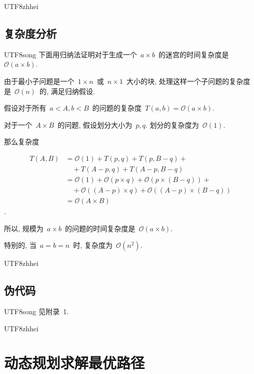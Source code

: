 \documentclass[10.5pt,compsoc]{CjC}
\theoremstyle{mystyle}
\begin{document}
\begin{CJK*}{UTF8}{zhhei}\subsection{复杂度分析}\end{CJK*}

\begin{CJK*}{UTF8}{song}
下面用归纳法证明对于生成一个~$a \times b$~的迷宫的时间复杂度是~$\mathcal{O}(a \times b)$.

由于最小子问题是一个~$1 \times n$~或~$n \times 1$~大小的块, 
处理这样一个子问题的复杂度是~$\mathcal{O}(n)$~的, 满足归纳假设.

假设对于所有~$a < A, b < B$~的问题的复杂度~$T(a,b) = \mathcal{O}(a \times b)$.

对于一个~$A \times B$~的问题, 假设划分大小为~$p, q$. 划分的复杂度为~$\mathcal{O}(1)$.

那么复杂度

\vskip -4mm

\begin{align*}
T(A,B) &= \mathcal{O}(1) + T(p,q) + T(p,B-q) + {} \\
       &\quad + T(A-p,q) + T(A-p,B-q) \\
       &= \mathcal{O}(1) + \mathcal{O}(p \times q) + \mathcal{O}(p \times (B - q)) + {} \\
       &\quad + \mathcal{O}((A - p) \times q) + \mathcal{O}((A - p) \times (B - q)) \\
       &= \mathcal{O}(A \times B)
\end{align*}.


所以, 规模为~$a \times b$~的问题的时间复杂度是~$\mathcal{O}(a \times b)$.

特别的, 当~$a=b=n$~时, 复杂度为~$\mathcal{O}(n^2)$.
\end{CJK*}

\begin{CJK*}{UTF8}{zhhei}\subsection{伪代码}\end{CJK*}

\begin{CJK*}{UTF8}{song}
见附录~1.
\end{CJK*}


\begin{CJK*}{UTF8}{zhhei}
\vskip 1mm
\section{动态规划求解最优路径}
\end{CJK*}
\end{document}
